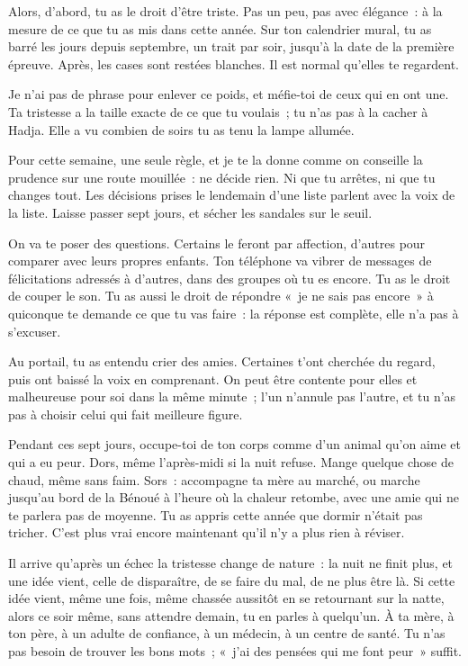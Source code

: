 \documentclass[10.5pt,twoside,openright]{book}
\begin{document}
Alors, d’abord, tu as le droit d’être triste. Pas un peu, pas avec élégance : à la mesure de ce que tu as mis dans cette année. Sur ton calendrier mural, tu as barré les jours depuis septembre, un trait par soir, jusqu’à la date de la première épreuve. Après, les cases sont restées blanches. Il est normal qu’elles te regardent.

Je n’ai pas de phrase pour enlever ce poids, et méfie-toi de ceux qui en ont une. Ta tristesse a la taille exacte de ce que tu voulais ; tu n’as pas à la cacher à Hadja. Elle a vu combien de soirs tu as tenu la lampe allumée.

Pour cette semaine, une seule règle, et je te la donne comme on conseille la prudence sur une route mouillée : ne décide rien. Ni que tu arrêtes, ni que tu changes tout. Les décisions prises le lendemain d’une liste parlent avec la voix de la liste. Laisse passer sept jours, et sécher les sandales sur le seuil.

On va te poser des questions. Certains le feront par affection, d’autres pour comparer avec leurs propres enfants. Ton téléphone va vibrer de messages de félicitations adressés à d’autres, dans des groupes où tu es encore. Tu as le droit de couper le son. Tu as aussi le droit de répondre « je ne sais pas encore » à quiconque te demande ce que tu vas faire : la réponse est complète, elle n’a pas à s’excuser.

Au portail, tu as entendu crier des amies. Certaines t’ont cherchée du regard, puis ont baissé la voix en comprenant. On peut être contente pour elles et malheureuse pour soi dans la même minute ; l’un n’annule pas l’autre, et tu n’as pas à choisir celui qui fait meilleure figure.

Pendant ces sept jours, occupe-toi de ton corps comme d’un animal qu’on aime et qui a eu peur. Dors, même l’après-midi si la nuit refuse. Mange quelque chose de chaud, même sans faim. Sors : accompagne ta mère au marché, ou marche jusqu’au bord de la Bénoué à l’heure où la chaleur retombe, avec une amie qui ne te parlera pas de moyenne. Tu as appris cette année que dormir n’était pas tricher. C’est plus vrai encore maintenant qu’il n’y a plus rien à réviser.

Il arrive qu’après un échec la tristesse change de nature : la nuit ne finit plus, et une idée vient, celle de disparaître, de se faire du mal, de ne plus être là. Si cette idée vient, même une fois, même chassée aussitôt en se retournant sur la natte, alors ce soir même, sans attendre demain, tu en parles à quelqu’un. À ta mère, à ton père, à un adulte de confiance, à un médecin, à un centre de santé. Tu n’as pas besoin de trouver les bons mots ; « j’ai des pensées qui me font peur » suffit.
\end{document}
